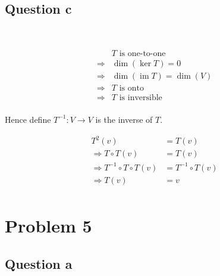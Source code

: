 \documentclass{article}
\DeclareMathOperator{\im}{im}
\begin{document}
\subsection{Question c}

~

\begin{equation*}
\begin{split}
&T \text{ is one-to-one}\\
\Rightarrow&\dim(\ker{T})=0\\
\Rightarrow&\dim(\im{T})=\dim(V)\\
\Rightarrow&T \text{ is onto}\\
\Rightarrow& T \text{ is inversible}\\
\end{split}
\end{equation*}

Hence define $T^{-1}:V\rightarrow V$ is the inverse of $T$.

\begin{equation*}
\begin{split}
T^2(v)&=T(v)\\
\Rightarrow T\circ T(v)&=T(v)\\
\Rightarrow T^{-1}\circ T\circ T(v)&=T^{-1}\circ T(v)\\
\Rightarrow T(v)&=v\\
\end{split}
\end{equation*}

\newpage

\section{Problem 5}

\subsection{Question a}

~
\end{document}
